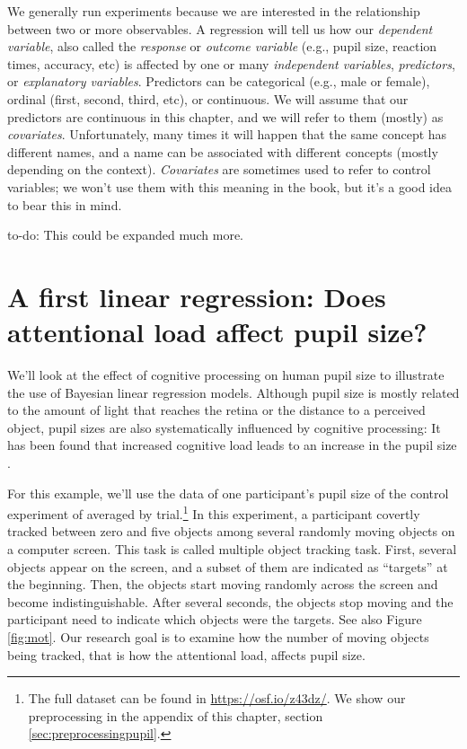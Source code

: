 \documentclass[12pt,]{krantz}
\makeatletter
\newenvironment{kframe}{%
\medskip{}
\setlength{\fboxsep}{.8em}
 \def\at@end@of@kframe{}%
 \ifinner\ifhmode%
  \def\at@end@of@kframe{\end{minipage}}%
  \begin{minipage}{\columnwidth}%
 \fi\fi%
 \def\FrameCommand##1{\hskip\@totalleftmargin \hskip-\fboxsep
 \colorbox{shadecolor}{##1}\hskip-\fboxsep
     \hskip-\linewidth \hskip-\@totalleftmargin \hskip\columnwidth}%
 \MakeFramed {\advance\hsize-\width
   \@totalleftmargin\z@ \linewidth\hsize
   \@setminipage}}%
 {\par\unskip\endMakeFramed%
 \at@end@of@kframe}
\newenvironment{rmdblock}[1]
  {
  \begin{itemize}
  \renewcommand{\labelitemi}{
    \raisebox{-.7\height}[0pt][0pt]{
      {\setkeys{Gin}{width=3em,keepaspectratio}\texttt{[image: images/\#1]}}
    }
  }
  \setlength{\fboxsep}{1em}
  \begin{kframe}
  \item
  }
  {
  \end{kframe}
  \end{itemize}
  }
\newenvironment{rmdnote}
  {\begin{rmdblock}{note}}
  {\end{rmdblock}}
\theoremstyle{definition}
\theoremstyle{definition}
\theoremstyle{definition}
\theoremstyle{remark}
\makeatother
\begin{document}
We generally run experiments because we are interested in the
relationship between two or more observables. A regression will tell us
how our \emph{dependent variable}, also called the \emph{response} or
\emph{outcome variable} (e.g., pupil size, reaction times, accuracy,
etc) is affected by one or many \emph{independent variables},
\emph{predictors}, or \emph{explanatory variables}. Predictors can be
categorical (e.g., male or female), ordinal (first, second, third, etc),
or continuous. We will assume that our predictors are continuous in this
chapter, and we will refer to them (mostly) as \emph{covariates}.
Unfortunately, many times it will happen that the same concept has
different names, and a name can be associated with different concepts
(mostly depending on the context). \emph{Covariates} are sometimes used
to refer to control variables; we won't use them with this meaning in
the book, but it's a good idea to bear this in mind.

\begin{rmdnote} to-do: This could be expanded much more.
\end{rmdnote}

\section{A first linear regression: Does attentional load affect pupil
size?}\label{sec:pupil}

We'll look at the effect of cognitive processing on human pupil size to
illustrate the use of Bayesian linear regression models. Although pupil
size is mostly related to the amount of light that reaches the retina or
the distance to a perceived object, pupil sizes are also systematically
influenced by cognitive processing: It has been found that increased
cognitive load leads to an increase in the pupil size \citep[for a
review, see][]{mathotPupillometryPsychologyPhysiology2018}.

For this example, we'll use the data of one participant's pupil size of
the control experiment of \citet{wahnPupilSizesScale2016} averaged by
trial.\footnote{The full dataset can be found in
  \url{https://osf.io/z43dz/}. We show our preprocessing in the appendix
  of this chapter, section \ref{sec:preprocessingpupil}.} In this
experiment, a participant covertly tracked between zero and five objects
among several randomly moving objects on a computer screen. This task is
called multiple object tracking \citep[or
MOT:][]{pylyshynTrackingMultipleIndependent1988} task. First, several
objects appear on the screen, and a subset of them are indicated as
``targets'' at the beginning. Then, the objects start moving randomly
across the screen and become indistinguishable. After several seconds,
the objects stop moving and the participant need to indicate which
objects were the targets. See also Figure \ref{fig:mot}. Our research
goal is to examine how the number of moving objects being tracked, that
is how the attentional load, affects pupil size.
\end{document}
